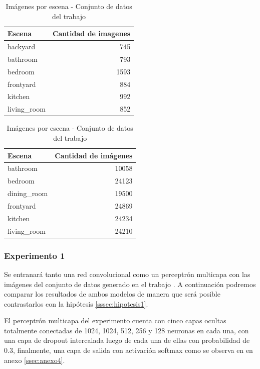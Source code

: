 \begin{table}[h!]
	\centering
	\begin{tabular}{| l | r | }
		\toprule
		Escena &  Cantidad de imagenes \\
		\midrule
		backyard &       745 \\
		bathroom &       793 \\
		bedroom &      1593 \\
		frontyard &       884 \\
		kitchen &       992 \\
		living\_room &       852 \\
		\bottomrule
	\end{tabular}
	\caption{Imágenes por escena - Conjunto de datos del trabajo \cite{lstm_real_estate}}
	\label{exp:distribution_rei}
\end{table}

\begin{table}[h!]
	\centering
	\begin{tabular}{| l | r | }
		\toprule
		Escena &  Cantidad de imágenes \\
		\midrule
		bathroom & 10058 \\
		bedroom & 24123 \\
		dining\_room & 19500 \\
		frontyard & 24869 \\
		kitchen & 24234 \\
		living\_room & 24210 \\
		\bottomrule
	\end{tabular}
	\caption{Imágenes por escena - 	Conjunto de datos del trabajo \cite{vision_based_real_estate_price_estimation}}
	\label{exp:distribution_vision_based}
\end{table}

\subsubsection{Experimento 1} \label{sssec:exp1}
Se entranará tanto una red convolucional como un perceptrón multicapa con las imágenes del conjunto de datos generado en el trabajo \cite{vision_based_real_estate_price_estimation}. A continuación podremos comparar los resultados de ambos modelos de manera que será posible contrastarlos con la hipótesis \ref{sssec:hipotesis1}.

El perceptrón multicapa del experimento cuenta con cinco capas ocultas totalmente conectadas de 1024, 1024, 512, 256 y 128 neuronas en cada una, con una capa de dropout intercalada luego de cada una de ellas con probabilidad de 0.3, finalmente, una capa de salida con activación softmax como se observa en en anexo \ref{ssec:anexo4}.


